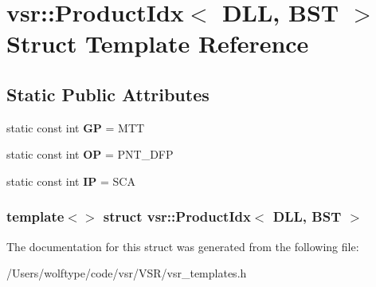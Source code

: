 \hypertarget{structvsr_1_1_product_idx_3_01_d_l_l_00_01_b_s_t_01_4}{\section{vsr\-:\-:Product\-Idx$<$ D\-L\-L, B\-S\-T $>$ Struct Template Reference}
\label{structvsr_1_1_product_idx_3_01_d_l_l_00_01_b_s_t_01_4}
}
\subsection*{Static Public Attributes}
\begin{DoxyCompactItemize}
\item 
\hypertarget{structvsr_1_1_product_idx_3_01_d_l_l_00_01_b_s_t_01_4_a6976cecaccd63db751059ce008e9f523}{static const int {\bfseries G\-P} = M\-T\-T}\label{structvsr_1_1_product_idx_3_01_d_l_l_00_01_b_s_t_01_4_a6976cecaccd63db751059ce008e9f523}

\item 
\hypertarget{structvsr_1_1_product_idx_3_01_d_l_l_00_01_b_s_t_01_4_ab984fd0ddb28bdfe35c36d18a2af1cf6}{static const int {\bfseries O\-P} = P\-N\-T\-\_\-\-D\-F\-P}\label{structvsr_1_1_product_idx_3_01_d_l_l_00_01_b_s_t_01_4_ab984fd0ddb28bdfe35c36d18a2af1cf6}

\item 
\hypertarget{structvsr_1_1_product_idx_3_01_d_l_l_00_01_b_s_t_01_4_a2ce9da40825712458440382a834c538e}{static const int {\bfseries I\-P} = S\-C\-A}\label{structvsr_1_1_product_idx_3_01_d_l_l_00_01_b_s_t_01_4_a2ce9da40825712458440382a834c538e}

\end{DoxyCompactItemize}
\subsubsection*{template$<$$>$ struct vsr\-::\-Product\-Idx$<$ D\-L\-L, B\-S\-T $>$}



The documentation for this struct was generated from the following file\-:\begin{DoxyCompactItemize}
\item 
/\-Users/wolftype/code/vsr/\-V\-S\-R/vsr\-\_\-templates.\-h\end{DoxyCompactItemize}
